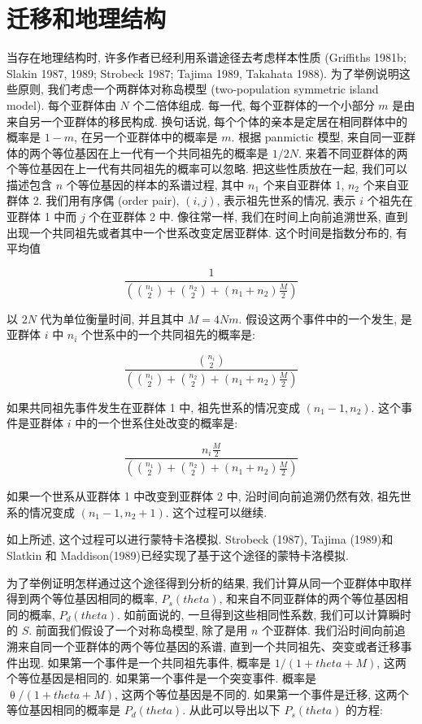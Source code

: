 \documentclass[
    12pt,%
    ]{article}
\begin{document}
\section{迁移和地理结构}

当存在地理结构时, 许多作者已经利用系谱途径去考虑样本性质 (Griffiths 1981b; Slakin 1987, 1989; Strobeck 1987;
Tajima 1989, Takahata 1988). 为了举例说明这些原则, 我们考虑一个两群体对称岛模型 (two-population symmetric
island model). 每个亚群体由 $N$ 个二倍体组成. 每一代, 每个亚群体的一个小部分 $m$ 是由来自另一个亚群体的移民构成.
换句话说, 每个个体的亲本是定居在相同群体中的概率是 $1-m$, 在另一个亚群体中的概率是 $m$. 根据 panmictic 模型,
来自同一亚群体的两个等位基因在上一代有一个共同祖先的概率是 $1/2N$.
来着不同亚群体的两个等位基因在上一代有共同祖先的概率可以忽略. 把这些性质放在一起, 我们可以描述包含 $n$
个等位基因的样本的系谱过程, 其中 $n_{1}$ 个来自亚群体 1, $n_{2}$ 个来自亚群体 2. 我们用有序偶 (order pair),
$(i,j)$, 表示祖先世系的情况, 表示 $i$ 个祖先在亚群体 1 中而 $j$ 个在亚群体 2 中. 像往常一样,
我们在时间上向前追溯世系, 直到出现一个共同祖先或者其中一个世系改变定居亚群体. 这个时间是指数分布的, 有平均值

\begin{equation*}
    \frac{1}{(\binom{n_1}{2}+\binom{n_2}{2}+(n_{1}+n_{2})\frac{M}{2})}
\end{equation*}

以 $2N$ 代为单位衡量时间, 并且其中 $M=4Nm$. 假设这两个事件中的一个发生, 是亚群体 $i$ 中 $n_{i}$
个世系中的一个共同祖先的概率是:

\begin{equation*}
    \frac{\binom{n_i}{2}}{(\binom{n_1}{2}+\binom{n_2}{2}+(n_{1}+n_{2})\frac{M}{2})}
\end{equation*}

如果共同祖先事件发生在亚群体 1 中, 祖先世系的情况变成 $(n_{1}-1,n_{2})$. 这个事件是亚群体 $i$
中的一个世系住处改变的概率是:

\begin{equation*}
    \frac{n_{i}\frac{M}{2}}{(\binom{n_1}{2} + \binom{n_2}{2} + (n_{1}+n_{2})\frac{M}{2})}
\end{equation*}

如果一个世系从亚群体 1 中改变到亚群体 2 中, 沿时间向前追溯仍然有效, 祖先世系的情况变成 $(n_{1}-1,n_{2}+1)$.
这个过程可以继续.

如上所述, 这个过程可以进行蒙特卡洛模拟. Strobeck (1987), Tajima (1989)和 Slatkin 和
Maddison(1989)已经实现了基于这个途径的蒙特卡洛模拟.

为了举例证明怎样通过这个途径得到分析的结果, 我们计算从同一个亚群体中取样得到两个等位基因相同的概率, $P_{s}(theta )$,
和来自不同亚群体的两个等位基因相同的概率, $P_{d}(theta )$. 如前面说的, 一旦得到这些相同性系数, 我们可以计算瞬时的 $S$.
前面我们假设了一个对称岛模型, 除了是用 $n$ 个亚群体. 我们沿时间向前追溯来自同一个亚群体的两个等位基因的系谱,
直到一个共同祖先、突变或者迁移事件出现. 如果第一个事件是一个共同祖先事件, 概率是 $1/(1+theta +M)$,
这两个等位基因是相同的. 如果第一个事件是一个突变事件. 概率是 $\uptheta /(1+theta +M)$, 这两个等位基因是不同的.
如果第一个事件是迁移, 这两个等位基因相同的概率是 $P_{d}(theta )$. 从此可以导出以下 $P_{s}(theta )$ 的方程:
\end{document}
